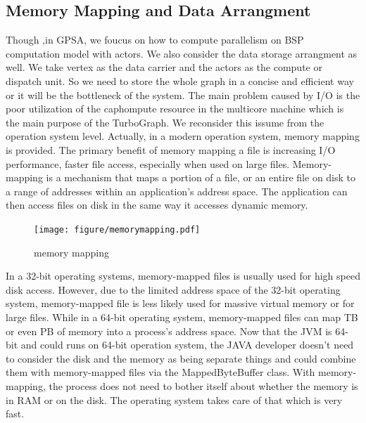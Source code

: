 \documentclass[twocolumn,a4paper,10pt]{article}
\begin{document}
\subsection{Memory Mapping and Data Arrangment}
Though ,in GPSA, we foucus on how to compute parallelism on BSP computation model with actors. We also consider the data storage arrangment as well. We take vertex as the data carrier and the actors as the compute or dispatch unit. So we need to store the whole graph in a concise and efficient way or it will be the bottleneck of the system. The main problem caused by I/O is the poor utilization of the caphompute resource in the multicore machine which is the main purpose of the TurboGraph. We reconsider this issume from the operation system level. Actually, in a modern operation system, memory mapping is provided. The primary benefit of memory mapping a file is increasing I/O performance, faster file access, especially when used on large files. Memory-mapping is a mechanism that maps a portion of a file, or an entire file on disk to a range of addresses within an application's address space. The application can then access files on disk in the same way it accesses dynamic memory.

\begin{figure}[htbp]
\centering
 \begin{minipage}[]{1.4\textwidth}
     \texttt{[image: figure/memorymapping.pdf]}
\end{minipage}
    \caption{memory mapping}
\end{figure}

In a 32-bit operating systems, memory-mapped files is usually used for high speed disk access. However, due to the limited address space of the 32-bit operating system, memory-mapped file is less likely used for massive virtual memory or for large files. While in a 64-bit operating system, memory-mapped files can map TB or even PB of memory into a process’s address space. Now that the JVM is 64-bit and could runs on 64-bit operation system, the JAVA developer doesn’t need to consider the disk and the memory as being separate things and could combine them with memory-mapped files via the MappedByteBuffer class. With memory-mapping, the process does not need to bother itself about whether the memory is in RAM or on the disk. The operating system takes care of that which is very fast. 
\end{document}
